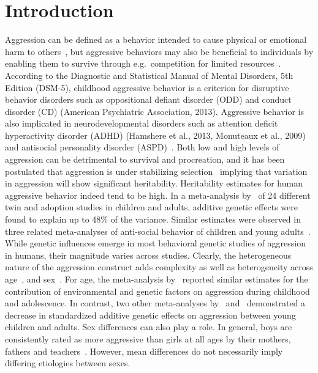 \section{Introduction}
Aggression can be defined as a behavior intended to cause physical or emotional harm to others~\cite{Anderson2002}, but aggressive behaviors may also be beneficial to individuals by enabling them to survive through e.g.\ competition for limited resources~\cite{Lindenfors2011}.
According to the Diagnostic and Statistical Manual of Mental Disorders, 5th Edition (DSM-5), childhood aggressive behavior is a criterion for disruptive behavior disorders such as oppositional defiant disorder (ODD) and conduct disorder (CD) (American Psychiatric Association, 2013).
Aggressive behavior is also implicated in neurodevelopmental disorders such as attention deficit hyperactivity disorder (ADHD) (Hamshere et al., 2013, Monuteaux et al., 2009) and antisocial personality disorder  (ASPD)~\cite{Nouvion2007, Schaeffer2003}.
Both low and high levels of aggression can be detrimental to survival and procreation, and it has been postulated that aggression is under stabilizing selection~\cite{Anholt2012} implying that variation in aggression will show significant heritability.
Heritability estimates for human aggressive behavior indeed tend to be high.
In a meta-analysis by~\citet{Miles1997} of 24 different twin and adoption studies in children and adults, additive genetic effects were found to explain up to 48\% of the variance.
Similar estimates were observed in three related meta-analyses of anti-social behavior of children and young adults~\cite{Ferguson2010, Mason1994, Rhee2002}. 
While genetic influences emerge in most behavioral genetic studies of aggression in humans, their magnitude varies across studies.
Clearly, the heterogeneous nature of the aggression construct adds complexity as well as heterogeneity across age~\cite{Rhee2002}, and sex~\cite{Vierikko2003}.
For age, the meta-analysis by~\citet{Miles1997} reported similar estimates for the contribution of environmental and genetic factors on aggression during childhood and adolescence.
In contrast, two other meta-analyses by~\citet{Ferguson2010} and~\citet{Rhee2002} demonstrated a decrease in standardized additive genetic effects on aggression between young children and adults. 
Sex differences can also play a role.
In general, boys are consistently rated as more aggressive than girls at all ages by their mothers, fathers and teachers~\cite{Hudziak2003}.
However, mean differences do not necessarily imply differing etiologies between sexes.
